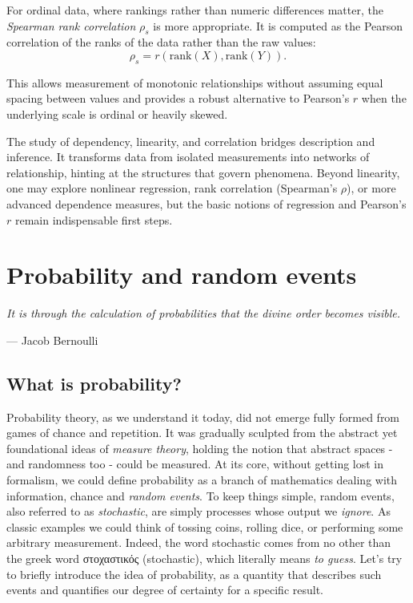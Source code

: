 \documentclass{book}
\begin{document}
\medskip

For ordinal data, where rankings rather than numeric differences matter, the \textit{Spearman rank correlation} $\rho_s$ is more appropriate. It is computed as the Pearson correlation of the ranks of the data rather than the raw values:
\begin{equation}
	\rho_s = r(\mathrm{rank}(X), \mathrm{rank}(Y)).
\end{equation}

This allows measurement of monotonic relationships without assuming equal spacing between values and provides a robust alternative to Pearson's $r$ when the underlying scale is ordinal or heavily skewed.

The study of dependency, linearity, and correlation bridges description and inference. It transforms data from isolated measurements into networks of relationship, hinting at the structures that govern phenomena. Beyond linearity, one may explore nonlinear regression, rank correlation (Spearman’s $\rho$), or more advanced dependence measures, but the basic notions of regression and Pearson’s $r$ remain indispensable first steps.\\



\chapter{Probability and random events}

\epigraph{\textit{It is through the calculation of probabilities that the divine order becomes visible.}}{— Jacob Bernoulli}

\section{What is probability?}

Probability theory, as we understand it today, did not emerge fully formed from games of chance and repetition. It was gradually sculpted from the abstract yet foundational ideas of \textit{measure theory}, holding the notion that abstract spaces - and randomness too - could be measured. At its core, without getting lost in formalism, we could define probability as a branch of mathematics dealing with information, chance and \textit{random events}. To keep things simple, random events, also referred to as \textit{stochastic}, are simply processes whose output we \textit{ignore}. As classic examples we could think of tossing coins, rolling dice, or performing some arbitrary measurement. Indeed, the word stochastic comes from no other than the greek word \textgreek{στοχαστικός} (stochastic), which literally means \textit{to guess}. Let's try to briefly introduce the idea of probability, as a quantity that describes such events and quantifies our degree of certainty for a specific result.
\end{document}
